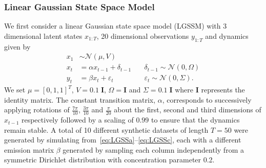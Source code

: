 \subsubsection{Linear Gaussian State Space Model}
\label{sec:LGSS}
We first consider a linear Gaussian state space model (LGSSM) with 3 dimensional latent states $x_{1:T}$, 20 dimensional observations $y_{1:T}$ and dynamics given by %
\begin{subequations}
	\label{eq:LGSS}
	\begin{align}
	x_1 & \sim \mathcal{N} \left(\mu, V\right) \label{eq:LGSSa}\\
	x_t & = \alpha x_{t-1} + \delta_{t-1} \quad & \delta_{t-1} \sim \mathcal{N} \left(0, \Omega\right) \label{eq:LGSSb}\\
	y_t & = \beta x_{t} + \varepsilon_{t} \quad & \varepsilon_{t} \sim \mathcal{N} \left(0, \Sigma\right).
	\label{eq:LGSSc}
	\end{align}
\end{subequations}
We set $\mu = [0, 1, 1]^T$, $V = 0.1 \; \mathbf{I}$, $\Omega = \mathbf{I}$ and $\Sigma = 0.1 \; \mathbf{I}$ where $\mathbf{I}$ represents the identity matrix.  The constant transition matrix, $\alpha$, corresponds to successively applying rotations of $\frac{7\pi}{10}$, $\frac{3\pi}{10}$ and $\frac{\pi}{20}$ about the first, second and third dimensions of $x_{t-1}$ respectively followed by a scaling of $0.99$ to ensure that the dynamics remain stable.  A total of 10 different synthetic datasets of length $T=50$ were generated by simulating from~\eqref{eq:LGSSa}--\eqref{eq:LGSSc}, each with a different emission matrix $\beta$ generated by sampling each column independently from a symmetric Dirichlet distribution with concentration parameter 0.2.

